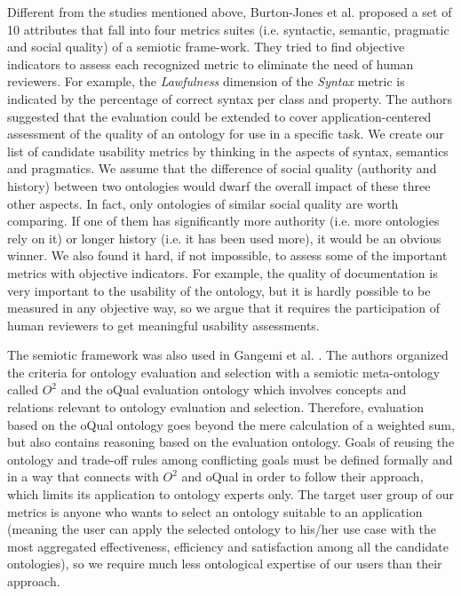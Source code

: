 Different from the studies mentioned above, Burton-Jones et al. \cite{burton2005semiotic} proposed a set of 10 attributes that fall into four metrics suites (i.e. syntactic, semantic, pragmatic and social quality) of a semiotic frame-work. They tried to find objective indicators to assess each recognized metric to eliminate the need of human reviewers. For example, the \emph{Lawfulness} dimension of the \emph{Syntax} metric is indicated by the percentage of correct syntax per class and property. The authors suggested that the evaluation could be extended to cover application-centered assessment of the quality of an ontology for use in a specific task. We create our list of candidate usability metrics by thinking in the aspects of syntax, semantics and pragmatics. We assume that the difference of social quality (authority and history) between two ontologies would dwarf the
overall impact of these three other aspects. In fact, only ontologies of similar social quality are worth comparing. If one of them has significantly more authority (i.e. more ontologies rely on it) or longer history (i.e. it has been used more), it would be an obvious winner. We also found it hard, if not impossible, to assess some of the important metrics with objective indicators. For example, the quality of documentation is very important to the usability of the ontology, but it is hardly possible to be measured in any objective way, so we argue that it requires the participation of human reviewers to get meaningful usability assessments.


The semiotic framework was also used in Gangemi et al. \cite{gangemi2006qood}. The authors organized the criteria for ontology evaluation and selection with a semiotic meta-ontology called $O^2$ and the oQual evaluation ontology which involves concepts and relations relevant to ontology evaluation and selection. Therefore, evaluation based on the oQual ontology goes beyond the mere calculation of a weighted sum, but also contains reasoning based on the evaluation ontology. Goals of reusing the ontology and trade-off rules among conflicting goals must be defined formally and in a way that connects with $O^2$ and oQual in order to follow their approach, which limits its application to ontology experts only. The target user group of our metrics is anyone who wants to select an ontology suitable to an application (meaning the user can apply the selected ontology to his/her use case with the most aggregated effectiveness, efficiency and satisfaction among all the candidate ontologies), so we require much less ontological expertise of our users than their approach.

